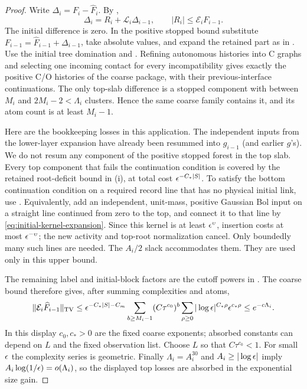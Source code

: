 \begin{proof}
Write $\Delta_i=F_i-\widehat F_i$.  By
,
\begin{equation}\label{eq:variation-recursion}
 \Delta_i=R_i+\mathcal L_i\Delta_{i-1},\qquad
 |R_i|\le\mathcal E_iF_{i-1}.
\end{equation}
The initial difference is zero.  In the positive stopped bound substitute
$F_{i-1}=\widehat F_{i-1}+\Delta_{i-1}$, take absolute values, and
expand the retained part as in .  Use the
initial tree domination and .  Refining autonomous
histories into C graphs and selecting one incoming contact for every
incompatibility gives exactly the positive C/O histories of the coarse
package, with their previous-interface continuations.  The only
top-slab difference is a stopped component with between $M_i$ and
$2M_i-2<\Lambda_i$ clusters.  Hence the same coarse family contains it,
and its atom count is at least $M_i-1$.

Here are the bookkeeping losses in this application.  The independent
inputs from the lower-layer expansion have already been resummed into
$g_{i-1}$ (and earlier $g$'s).  We do not resum any component of the
positive stopped forest in the top slab.  Every top component that
fails the continuation condition is covered by the retained
root-deficit bound in (i), at total cost
$\epsilon^{-C_*|S|}$.  To satisfy the bottom continuation condition on a
required record line that has no physical initial link, use
.  Equivalently, add an independent, unit-mass,
positive Gaussian Bol input on a straight line continued from zero to
the top, and connect it to that line by
\eqref{eq:initial-kernel-expansion}.  Since this kernel is at least
$\epsilon^\upsilon$, insertion costs at most $\epsilon^{-\upsilon}$; the new
activity and top-root normalization cancel.  Only boundedly many such
lines are needed.  The $A_i/2$ slack accommodates them.  They are used
only in this upper bound.

The remaining label and initial-block factors are the cutoff powers in
.  The coarse bound therefore gives, after
summing complexities and atoms,
\begin{equation}\label{eq:stopped-coarse-estimate}
 \|\mathcal E_i\widehat F_{i-1}\|_{\mathrm{TV}}
  \le \epsilon^{-C_*|S|-C_{m}}
          \sum_{b\ge M_i-1}(C\tau^{c_0})^b
          \sum_{\rho\ge0}|\log\epsilon|^{C_*\rho}\epsilon^{c_*\rho}
  \le e^{-c\Lambda_i}.
\end{equation}
In this display $c_0,c_*>0$ are the fixed coarse exponents; absorbed
constants can depend on $L$ and the fixed observation list.  Choose
$L$ so that $C\tau^{c_0}<1$.  For small $\epsilon$ the complexity series is
geometric.  Finally $\Lambda_i=A_i^{30}$ and $A_i\ge|\log\epsilon|$ imply
$A_i\log(1/\epsilon)=o(\Lambda_i)$, so the displayed top losses are
absorbed in the exponential size gain.


\end{proof}
